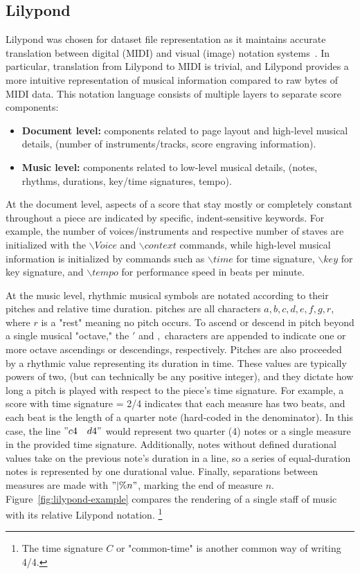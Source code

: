 \documentclass[nonacm, sigconf]{acmart}
\begin{document}
\subsection{Lilypond}
Lilypond was chosen for dataset file representation as it maintains accurate translation between digital (MIDI) and visual (image) notation systems~\cite{lilypond}.
In particular, translation from Lilypond to MIDI is trivial, and Lilypond provides a more intuitive representation of musical information compared to raw bytes of MIDI data.
This notation language consists of multiple layers to separate score components:

\begin{itemize}
		\item \textbf{Document level:} components related to page layout and high-level musical details, (number of instruments/tracks, score engraving information).
		\item \textbf{Music level:} components related to low-level musical details, (notes, rhythms, durations, key/time signatures, tempo).
\end{itemize}

At the document level, aspects of a score that stay mostly or completely constant throughout a piece are indicated by specific, indent-sensitive keywords.
For example, the number of voices/instruments and respective number of staves are initialized with the $\backslash{Voice}$ and $\backslash{context}$ commands,
while high-level musical information is initialized by commands such as $\backslash{time}$ for time signature, $\backslash{key}$ for key signature, and $\backslash{tempo}$ for performance speed in beats per minute.  

At the music level, rhythmic musical symbols are notated according to their pitches and relative time duration.
pitches are all characters ${a, b, c, d, e, f, g, r}$, where $r$ is a "rest" meaning no pitch occurs.
To ascend or descend in pitch beyond a single musical "octave," the $'$ and $,$ characters are appended to indicate one or more octave ascendings or descendings, respectively.
Pitches are also proceeded by a rhythmic value representing its duration in time.
These values are typically powers of two, (but can technically be any positive integer), and they dictate how long a pitch is played with respect to the piece's time signature.
For example, a score with time signature = 2/4 indicates that each measure has two beats, and each beat is the length of a quarter note (hard-coded in the denominator).
In this case, the line $"c4 \quad d4"$ would represent two quarter (4) notes or a single measure in the provided time signature.
Additionally, notes without defined durational values take on the previous note's duration in a line, so a series of equal-duration notes is represented by one durational value.
Finally, separations between measures are made with $"| \% n"$, marking the end of measure $n$.
Figure~\ref{fig:lilypond-example} compares the rendering of a single staff of music with its relative Lilypond notation.
\footnote{The time signature $C$ or "common-time" is another common way of writing 4/4.}
\end{document}
